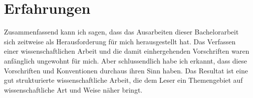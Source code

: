 \section{Erfahrungen}
Zusammenfassend kann ich sagen, dass das Ausarbeiten dieser Bachelorarbeit sich zeitweise als Herausforderung für mich herausgestellt hat. Das Verfassen einer wissenschaftlichen Arbeit und die damit einhergehenden Vorschriften waren anfänglich ungewohnt für mich. Aber schlussendlich habe ich erkannt, dass diese Vorschriften und Konventionen durchaus ihren Sinn haben. Das Resultat ist eine gut strukturierte wissenschaftliche Arbeit, die dem Leser ein Themengebiet auf wissenschaftliche Art und Weise näher bringt.